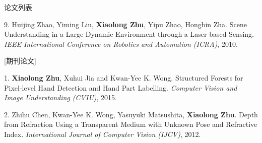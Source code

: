 \documentclass[UTF8]{cv_professional-cn} %
\makeatletter
\newlength{\bibhang}
\newlength{\bibsep}
 {\@listi \global\bibsep\itemsep \global\advance\bibsep by\parsep}
\newenvironment{bibsection}%
        {\vspace{\itemsep}\begin{list}{}{%
       \setlength{\leftmargin}{\bibhang}%
       \setlength{\itemsep}{\bibsep}%
       \setlength{\parsep}{\z@}%
        \setlength{\partopsep}{0pt}%
        \setlength{\topsep}{0pt}}}
        {\end{list}\vspace{\itemsep}}
\makeatother
\begin{document}
\begin{rSection}{论文列表}
\begin{bibsection}
	\item[9.] Huijing Zhao, Yiming Liu,\textbf{ Xiaolong Zhu}, Yipu Zhao, Hongbin Zha. Scene Understanding in a Large Dynamic Environment through a Laser-based Sensing. \emph{IEEE International Conference on Robotics and Automation (ICRA)}, 2010.
\end{bibsection}

[期刊论文]

\begin{bibsection}
	\item[1.] \textbf{Xiaolong Zhu}, Xuhui Jia and Kwan-Yee K. Wong. Structured Forests for Pixel-level Hand Detection and Hand Part Labelling. \emph{Computer Vision and Image Understanding (CVIU)}, 2015.

  \item[2.] Zhihu Chen, Kwan-Yee K. Wong, Yasuyuki Matsushita, \textbf{Xiaolong Zhu}. Depth from Refraction Using a Transparent Medium with Unknown Pose and Refractive Index. \emph{International Journal of Computer Vision (IJCV)}, 2012.

\end{bibsection}

\end{rSection}



\end{document}

